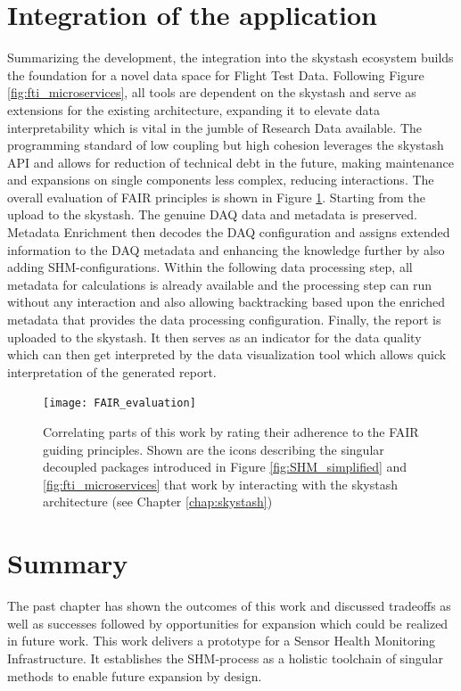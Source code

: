 \section{Integration of the application}

Summarizing the development, the integration into the skystash ecosystem builds the foundation for a novel data space for Flight Test Data. Following Figure \ref{fig:fti_microservices}, all tools are dependent on the skystash and serve as extensions for the existing architecture, expanding it to elevate data interpretability which is vital in the jumble of Research Data available. The programming standard of low coupling but high cohesion \cite{stevens_structured_1974} leverages the skystash API and allows for reduction of technical debt in the future, making maintenance and expansions on single components less complex, reducing interactions.
The overall evaluation of FAIR principles is shown in Figure \ref{fig:FAIR_evaluation}. Starting from the upload to the skystash. The genuine DAQ data and metadata is preserved. Metadata Enrichment then decodes the DAQ configuration and assigns extended information to the DAQ metadata and enhancing the knowledge further by also adding SHM-configurations. Within the following data processing step, all metadata for calculations is already available and the processing step can run without any interaction and also allowing backtracking based upon the enriched metadata that provides the data processing configuration. Finally, the report is uploaded to the skystash. It then serves as an indicator for the data quality which can then get interpreted by the data visualization tool which allows quick interpretation of the generated report.


\begin{figure}
    \centering
    \texttt{[image: FAIR\_evaluation]}
    \caption[FAIR-correlation matrix for the SHM-]{Correlating parts of this work by rating their adherence to the FAIR guiding principles. Shown are the icons describing the singular decoupled packages introduced in Figure \ref{fig:SHM_simplified} and \ref{fig:fti_microservices} that work by interacting with the skystash architecture (see Chapter \ref{chap:skystash})}
    \label{fig:FAIR_evaluation}
\end{figure}

\section{Summary}
The past chapter has shown the outcomes of this work and discussed tradeoffs as well as successes followed by opportunities for expansion which could be realized in future work.
This work delivers a prototype for a Sensor Health Monitoring Infrastructure. It establishes the SHM-process as a holistic toolchain of singular methods to enable future expansion by design.



